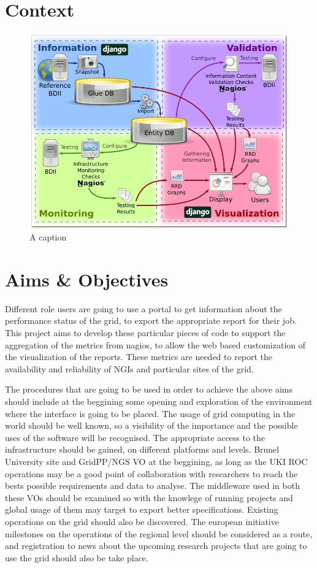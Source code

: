 \section{Context}

\begin{figure}[htb]
\centering
\includegraphics[width=150mm]{images/gstat-architecture.jpg}
\caption{A caption}
\label{figure:alabel}
\end{figure}

\section{Aims \& Objectives}
Different role users are going to use a portal to get information about the
performance status of the grid, to export the appropriate report for their job.
This project aims to develop these particular pieces of code to support the 
aggregation of the metrics from nagios, to allow the web based customization of
the visualization of the reports. These metrics are needed to report the
availability and reliability of NGIs and particular sites of the grid.

The procedures that are going to be used in order to achieve the above aims
should include at the beggining some opening and exploration of the environment
where the interface is going to be placed. The usage of grid computing in
the world should be well known, so a visibility of the importance and the
possible uses of the software will be recognised. The appropriate
access to the infrastructure should be gained, on different platforms and levels.
Brunel University site and GridPP/NGS VO at the beggining, as long as the UKI
ROC operations may be a good point of collaboration with researchers to reach
the bests possible requirements and data to analyse. The middleware used in
both these VOs should be examined so with the knowlege of running projects and
global usage of them may target to export better specifications. Existing
operations on the grid should also be discovered. The european initiative
milestones on the operations of the regional level should be considered as a
route, and registration to news about the upcoming research projects that
are going to use the grid should also be take place.


